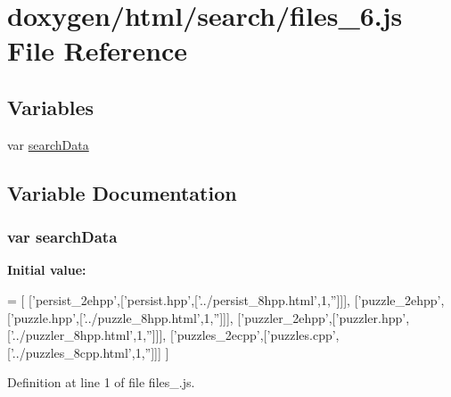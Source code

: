 \hypertarget{a00079}{}\section{doxygen/html/search/files\+\_\+6.js File Reference}
\label{a00079}
\subsection*{Variables}
\begin{DoxyCompactItemize}
\item 
var \hyperlink{a00079_ad01a7523f103d6242ef9b0451861231e}{search\+Data}
\end{DoxyCompactItemize}


\subsection{Variable Documentation}
\hypertarget{a00079_ad01a7523f103d6242ef9b0451861231e}{}
\subsubsection[{search\+Data}]{\setlength{\rightskip}{0pt plus 5cm}var search\+Data}\label{a00079_ad01a7523f103d6242ef9b0451861231e}
{\bfseries Initial value\+:}
\begin{DoxyCode}
=
[
  [\textcolor{stringliteral}{'persist\_2ehpp'},[\textcolor{stringliteral}{'persist.hpp'},[\textcolor{stringliteral}{'../persist\_8hpp.html'},1,\textcolor{stringliteral}{''}]]],
  [\textcolor{stringliteral}{'puzzle\_2ehpp'},[\textcolor{stringliteral}{'puzzle.hpp'},[\textcolor{stringliteral}{'../puzzle\_8hpp.html'},1,\textcolor{stringliteral}{''}]]],
  [\textcolor{stringliteral}{'puzzler\_2ehpp'},[\textcolor{stringliteral}{'puzzler.hpp'},[\textcolor{stringliteral}{'../puzzler\_8hpp.html'},1,\textcolor{stringliteral}{''}]]],
  [\textcolor{stringliteral}{'puzzles\_2ecpp'},[\textcolor{stringliteral}{'puzzles.cpp'},[\textcolor{stringliteral}{'../puzzles\_8cpp.html'},1,\textcolor{stringliteral}{''}]]]
]
\end{DoxyCode}


Definition at line 1 of file files\+\_.\+js.

